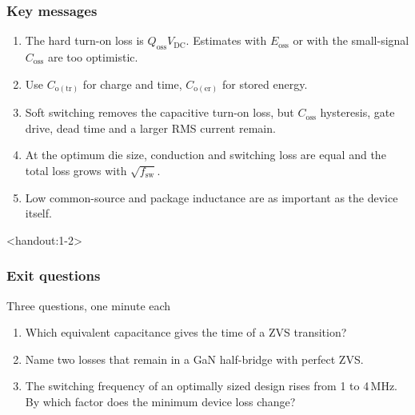 \begin{frame}
	\frametitle{Key messages}
	\begin{enumerate}
		\item The hard turn-on loss is $Q_\mathrm{oss}V_\mathrm{DC}$. Estimates with $E_\mathrm{oss}$ or with the small-signal $C_\mathrm{oss}$ are too optimistic.
		\item Use $C_\mathrm{o(tr)}$ for charge and time, $C_\mathrm{o(er)}$ for stored energy.
		\item Soft switching removes the capacitive turn-on loss, but $C_\mathrm{oss}$ hysteresis, gate drive, dead time and a larger RMS current remain.
		\item At the optimum die size, conduction and switching loss are equal and the total loss grows with $\sqrt{f_\mathrm{sw}}$.
		\item Low common-source and package inductance are as important as the device itself.
	\end{enumerate}
\end{frame}

\begin{frame}<handout:1-2>
	\frametitle{Exit questions}
	\begin{varblock}[\textwidth]{Three questions, one minute each}
		\begin{enumerate}
			\item Which equivalent capacitance gives the time of a ZVS transition?
			\item Name two losses that remain in a GaN half-bridge with perfect ZVS.
			\item The switching frequency of an optimally sized design rises from 1 to 4\,MHz. By which factor does the minimum device loss change?
		\end{enumerate}
	\end{varblock}
\end{frame}

